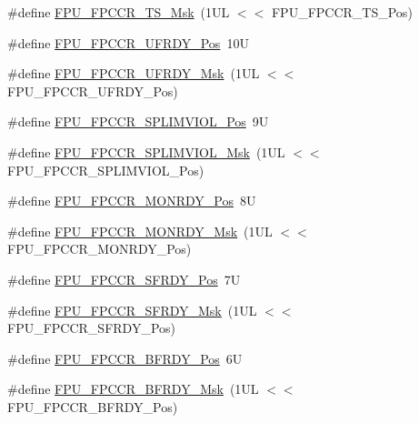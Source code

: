 \begin{DoxyCompactItemize}
\#define \hyperlink{group___c_m_s_i_s___f_p_u_ga1377a5dfb4b9c6b18e379ac15e0dc23e}{F\+P\+U\+\_\+\+F\+P\+C\+C\+R\+\_\+\+T\+S\+\_\+\+Msk}~(1\+U\+L $<$$<$ F\+P\+U\+\_\+\+F\+P\+C\+C\+R\+\_\+\+T\+S\+\_\+\+Pos)
\item 
\#define \hyperlink{group___c_m_s_i_s___f_p_u_gac48b42e143b93411977dcb9086a5e4e4}{F\+P\+U\+\_\+\+F\+P\+C\+C\+R\+\_\+\+U\+F\+R\+D\+Y\+\_\+\+Pos}~10U
\item 
\#define \hyperlink{group___c_m_s_i_s___f_p_u_ga97c610927aab580cac3fb166f080b6a6}{F\+P\+U\+\_\+\+F\+P\+C\+C\+R\+\_\+\+U\+F\+R\+D\+Y\+\_\+\+Msk}~(1\+U\+L $<$$<$ F\+P\+U\+\_\+\+F\+P\+C\+C\+R\+\_\+\+U\+F\+R\+D\+Y\+\_\+\+Pos)
\item 
\#define \hyperlink{group___c_m_s_i_s___f_p_u_gac90e551e3cfda27c089bf381acba5aa0}{F\+P\+U\+\_\+\+F\+P\+C\+C\+R\+\_\+\+S\+P\+L\+I\+M\+V\+I\+O\+L\+\_\+\+Pos}~9U
\item 
\#define \hyperlink{group___c_m_s_i_s___f_p_u_gaa5e511cae62f922a9a91af0972f7a5e6}{F\+P\+U\+\_\+\+F\+P\+C\+C\+R\+\_\+\+S\+P\+L\+I\+M\+V\+I\+O\+L\+\_\+\+Msk}~(1\+U\+L $<$$<$ F\+P\+U\+\_\+\+F\+P\+C\+C\+R\+\_\+\+S\+P\+L\+I\+M\+V\+I\+O\+L\+\_\+\+Pos)
\item 
\#define \hyperlink{group___c_m_s_i_s___f_p_u_gae0a4effc79209d821ded517c2be326ba}{F\+P\+U\+\_\+\+F\+P\+C\+C\+R\+\_\+\+M\+O\+N\+R\+D\+Y\+\_\+\+Pos}~8U
\item 
\#define \hyperlink{group___c_m_s_i_s___f_p_u_ga42067729a887081cf56b8fe1029be7a1}{F\+P\+U\+\_\+\+F\+P\+C\+C\+R\+\_\+\+M\+O\+N\+R\+D\+Y\+\_\+\+Msk}~(1\+U\+L $<$$<$ F\+P\+U\+\_\+\+F\+P\+C\+C\+R\+\_\+\+M\+O\+N\+R\+D\+Y\+\_\+\+Pos)
\item 
\#define \hyperlink{group___c_m_s_i_s___f_p_u_ga571354f040a9372c0ad0cb87e296ea7d}{F\+P\+U\+\_\+\+F\+P\+C\+C\+R\+\_\+\+S\+F\+R\+D\+Y\+\_\+\+Pos}~7U
\item 
\#define \hyperlink{group___c_m_s_i_s___f_p_u_ga419a1e5609bbedf94f518c72214bddbc}{F\+P\+U\+\_\+\+F\+P\+C\+C\+R\+\_\+\+S\+F\+R\+D\+Y\+\_\+\+Msk}~(1\+U\+L $<$$<$ F\+P\+U\+\_\+\+F\+P\+C\+C\+R\+\_\+\+S\+F\+R\+D\+Y\+\_\+\+Pos)
\item 
\#define \hyperlink{group___c_m_s_i_s___f_p_u_ga6d633920f92c3ce4133d769701619b17}{F\+P\+U\+\_\+\+F\+P\+C\+C\+R\+\_\+\+B\+F\+R\+D\+Y\+\_\+\+Pos}~6U
\item 
\#define \hyperlink{group___c_m_s_i_s___f_p_u_gad349eb1323d8399d54a04c0bfd520cb2}{F\+P\+U\+\_\+\+F\+P\+C\+C\+R\+\_\+\+B\+F\+R\+D\+Y\+\_\+\+Msk}~(1\+U\+L $<$$<$ F\+P\+U\+\_\+\+F\+P\+C\+C\+R\+\_\+\+B\+F\+R\+D\+Y\+\_\+\+Pos)
\item 

\end{DoxyCompactItemize}
